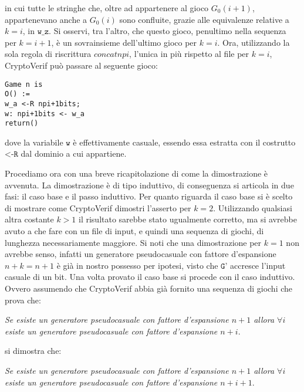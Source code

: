 \documentclass[a4paper,openright,twoside,12pt]{report}
\begin{document}
in cui tutte le stringhe che, oltre ad appartenere al gioco $G_0(i+1)$, appartenevano anche a $G_0(i)$ sono confluite, 
grazie alle equivalenze relative a $k=i$, in $\texttt{w\_z}$. Si osservi, tra l'altro, che questo gioco, penultimo nella sequenza per $k=i+1$, 
\`e un sovrainsieme dell'ultimo gioco per $k=i$.
Ora, utilizzando la sola regola di riscrittura $concatnpi$, l'unica in pi\`u rispetto al file per $k=i$, 
CryptoVerif pu\`o passare al seguente gioco:
\begin{verbatim}
Game n is
O() :=
w_a <-R npi+1bits;
w: npi+1bits <- w_a
return()
\end{verbatim}
dove la variabile $\texttt{w}$ \`e effettivamente casuale, essendo essa estratta con il costrutto $\texttt{<-R}$ dal dominio a cui
appartiene.


Procediamo ora con una breve ricapitolazione di come la dimostrazione \`e avvenuta.
La dimostrazione \`e di tipo induttivo, di conseguenza si articola in due fasi: il caso base e il passo induttivo.
Per quanto riguarda il caso base si \`e scelto di mostrare come CryptoVerif dimostri l'asserto per $k=2$. Utilizzando qualsiasi altra costante 
$k > 1$ il risultato sarebbe stato ugualmente corretto, ma si avrebbe avuto a che fare con un file di input, e quindi una sequenza di giochi, di 
lunghezza necessariamente maggiore. Si noti che una dimostrazione per $k=1$ non avrebbe senso, infatti un generatore pseudocasuale con
fattore d'espansione $n+k=n+1$ \`e gi\`a in nostro possesso per ipotesi, visto che $\texttt{G'}$ accresce l'input casuale di un bit.
Una volta provato il caso base si procede con il caso induttivo.
Ovvero assumendo che CryptoVerif abbia gi\`a fornito una sequenza di giochi che prova che:
\begin{center}
\emph{Se esiste un generatore pseudocasuale con fattore d'espansione $n+1$ allora $\forall i$ esiste un generatore pseudocasuale con fattore d'espansione $n+i$}.
\end{center}

si dimostra che:
\begin{center}
\emph{Se esiste un generatore pseudocasuale con fattore d'espansione $n+1$ allora $\forall i$ esiste un generatore pseudocasuale con fattore d'espansione $n+i+1$}. 
\end{center}
\end{document}
